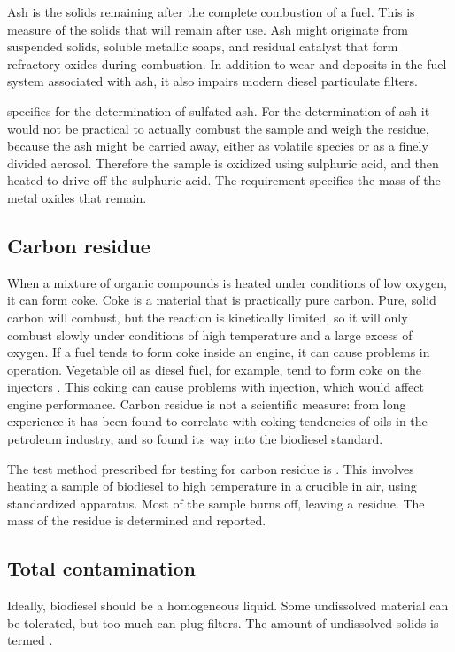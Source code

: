 Ash is the solids remaining after the complete combustion of a fuel. This is
measure of the solids that will remain after use. Ash might originate from
suspended solids, soluble metallic soaps, and residual catalyst that form
refractory oxides during combustion. In addition to wear and deposits in the
fuel system associated with ash, it also impairs modern diesel particulate
filters.

 specifies  for the determination of sulfated ash.
For the determination of ash it would not be practical to actually combust the
sample and weigh the residue, because the ash might be carried away, either as
volatile species or as a finely divided aerosol. Therefore the sample is
oxidized using sulphuric acid, and then heated to drive off the sulphuric acid.
The requirement specifies the mass of the metal oxides that remain.

\subsection{Carbon residue}

When a mixture of organic compounds is heated under conditions of low oxygen, it
can form coke. Coke is a material that is practically pure carbon. Pure, solid
carbon will combust, but the reaction is kinetically limited, so it will only
combust slowly under conditions of high temperature and a large excess of
oxygen. If a fuel tends to form coke inside an engine, it can cause problems in
operation. Vegetable oil as diesel fuel, for example, tend to form coke on the
injectors \autocite{vanderWalt1982}. This coking can cause problems with
injection, which would affect engine performance. Carbon residue is not a
scientific measure: from long experience it has been found to correlate with
coking tendencies of oils in the petroleum industry, and so found its way into
the biodiesel standard.

The test method prescribed for testing for carbon residue is .
This involves heating a sample of biodiesel to high temperature in a crucible in
air, using standardized apparatus. Most of the sample burns off, leaving a
residue. The mass of the residue is determined and reported.

\subsection{Total contamination}

Ideally, biodiesel should be a homogeneous liquid. Some undissolved material can
be tolerated, but too much can plug filters. The amount of undissolved solids is
termed .

